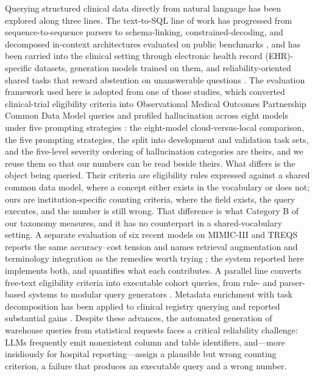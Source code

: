 \documentclass[applsci,article,submit,pdftex,oneauthor]{Definitions/mdpi}
\begin{document}
Querying structured clinical data directly from natural language has been explored along three lines. The text-to-SQL line of
work has progressed from sequence-to-sequence parsers to schema-linking,
constrained-decoding, and decomposed in-context architectures evaluated on public
benchmarks \cite{zhong2017,yu2018,wang2020,scholak2021,pourreza2023,bird2023,dailsql2024,macsql2024},
and has been carried into the clinical setting through electronic health record
(EHR)-specific datasets,
generation models trained on them, and reliability-oriented shared tasks that
reward abstention on unanswerable questions
\cite{treqs2020,medts2021,ehrsql2024,ragepi2024,rag2step2025}. The evaluation
framework used here is adopted from one of those studies, which converted
clinical-trial eligibility criteria into Observational Medical Outcomes Partnership
Common Data Model queries and profiled hallucination across eight models under
five prompting strategies \cite{lee2025}: the eight-model cloud-versus-local
comparison, the five prompting strategies, the split into development and
validation task sets, and the five-level severity ordering of hallucination
categories are theirs, and we reuse them so that our numbers can be read beside
theirs. What differs is the object being queried. Their criteria are eligibility
rules expressed against a shared common data model, where a concept either exists
in the vocabulary or does not; ours are institution-specific counting criteria,
where the field exists, the query executes, and the number is still wrong. That
difference is what Category B of our taxonomy measures, and it has no counterpart
in a shared-vocabulary setting. A separate evaluation of six recent models on
MIMIC-III and TREQS reports the same accuracy--cost tension and names
retrieval augmentation and terminology integration as the remedies worth trying
\cite{tankovic2025}; the system reported here implements both, and quantifies
what each contributes. A parallel line
converts free-text eligibility criteria into executable cohort queries, from
rule- and parser-based systems to modular query generators
\cite{c2q2019,trialpath2021,leafai2023}. Metadata enrichment with task
decomposition has been applied to clinical registry querying and reported
substantial gains \cite{metaclin2025}. Despite these advances, the automated generation of warehouse
queries from statistical requests faces a critical reliability challenge: LLMs
frequently emit nonexistent column and table identifiers, and---more insidiously
for hospital reporting---assign a plausible but wrong counting criterion, a
failure that produces an executable query and a wrong number.
\end{document}
